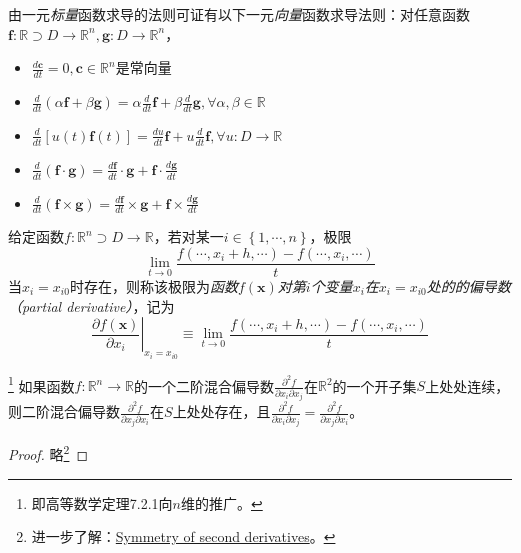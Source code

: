 \documentclass[main.tex]{subfiles}
\begin{document}
由一元\emph{标量}函数求导的法则可证有以下一元\emph{向量}函数求导法则：对任意函数$\mathbf{f}:\mathbb{R}\supset D\rightarrow\mathbb{R}^n,\mathbf{g}:D\rightarrow\mathbb{R}^n$，
\begin{itemize}
    \item $\frac{d\mathbf{c}}{dt}=0,\mathbf{c}\in\mathbb{R}^n$是常向量
    \item $\frac{d}{dt}\left(\alpha\mathbf{f}+\beta\mathbf{g}\right)=\alpha\frac{d}{dt}\mathbf{f}+\beta\frac{d}{dt}\mathbf{g},\forall \alpha,\beta\in\mathbb{R}$
    \item $\frac{d}{dt}\left[u\left(t\right)\mathbf{f}\left(t\right)\right]=\frac{du}{dt}\mathbf{f}+u\frac{d}{dt}\mathbf{f},\forall u:D\rightarrow\mathbb{R}$
    \item $\frac{d}{dt}\left(\mathbf{f}\cdot\mathbf{g}\right)=\frac{d\mathbf{f}}{dt}\cdot\mathbf{g}+\mathbf{f}\cdot\frac{d\mathbf{g}}{dt}$
    \item $\frac{d}{dt}\left(\mathbf{f}\times\mathbf{g}\right)=\frac{d\mathbf{f}}{dt}\times\mathbf{g}+\mathbf{f}\times\frac{d\mathbf{g}}{dt}$
\end{itemize}

\begin{definition}[多元标量值函数的偏导数]\label{def:II.4.10}
    给定函数$f:\mathbb{R}^n\supset D\rightarrow\mathbb{R}$，若对某一$i\in\left\{1,\cdots,n\right\}$，极限
    \[
        \lim_{t\to0}\frac{f\left(\cdots,x_{i}+h,\cdots\right)-f\left(\cdots,x_{i},\cdots\right)}{t}
    \]
    当$x_i=x_{i0}$时存在，则称该极限为\emph{函数$f\left(\mathbf{x}\right)$对第$i$个变量$x_i$在$x_i=x_{i0}$处的的偏导数（partial derivative）}，记为
    \[\left.\frac{\partial f\left(\mathbf{x}\right)}{\partial x_i}\right|_{x_i=x_{i0}}\equiv\lim_{t\to0}\frac{f\left(\cdots,x_{i}+h,\cdots\right)-f\left(\cdots,x_i,\cdots\right)}{t}
    \]
\end{definition}

\begin{theorem}\label{thm:II.4.6}\footnote{即高等数学\cite[p.~16]{华工高数2009下}定理7.2.1向$n$维的推广。}
    如果函数$f:\mathbb{R}^n\rightarrow\mathbb{R}$的一个二阶混合偏导数$\frac{\partial^2f}{\partial x_i\partial x_j}$在$\mathbb{R}^2$的一个开子集$S$上处处连续，则二阶混合偏导数$\frac{\partial^2f}{\partial x_j\partial x_i}$在$S$上处处存在，且$\frac{\partial^2f}{\partial x_i\partial x_j}=\frac{\partial^2f}{\partial x_j\partial x_i}$。
\end{theorem}
\begin{proof}
    略\footnote{进一步了解：\href{https://en.wikipedia.org/wiki/Symmetry_of_second_derivatives}{Symmetry of second derivatives}。}
\end{proof}
\end{document}
